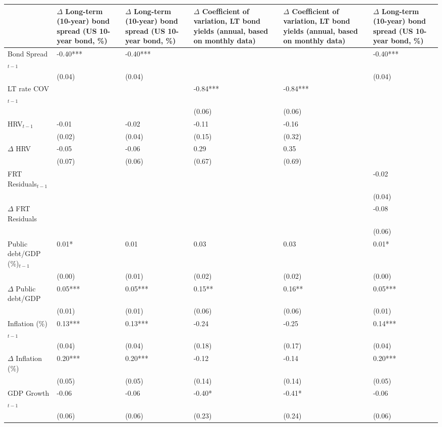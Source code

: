 \begingroup\tiny
\begin{tabular}{lp{3cm}p{3cm}p{3cm}p{3cm}p{3cm}}
  \hline
 & $\Delta$ Long-term (10-year) bond spread (US 10-year bond, \%) & $\Delta$ Long-term (10-year) bond spread (US 10-year bond, \%) & $\Delta$ Coefficient of variation, LT bond yields (annual, based on monthly data) & $\Delta$ Coefficient of variation, LT bond yields (annual, based on monthly data) & $\Delta$ Long-term (10-year) bond spread (US 10-year bond, \%) \\ 
  \hline
Bond Spread$_{t-1}$ & -0.40*** & -0.40*** &  &  & -0.40*** \\ 
   & (0.04) & (0.04) &  &  & (0.04) \\ 
  LT rate COV$_{t-1}$ &  &  & -0.84*** & -0.84*** &  \\ 
   &  &  & (0.06) & (0.06) &  \\ 
  HRV$_{t-1}$ & -0.01 & -0.02 & -0.11 & -0.16 &  \\ 
   & (0.02) & (0.04) & (0.15) & (0.32) &  \\ 
  $\Delta$ HRV & -0.05 & -0.06 & 0.29 & 0.35 &  \\ 
   & (0.07) & (0.06) & (0.67) & (0.69) &  \\ 
  FRT Residuals$_{t-1}$ &  &  &  &  & -0.02 \\ 
   &  &  &  &  & (0.04) \\ 
  $\Delta$ FRT Residuals &  &  &  &  & -0.08 \\ 
   &  &  &  &  & (0.06) \\ 
  Public debt/GDP (\%)$_{t-1}$ & 0.01* & 0.01 & 0.03 & 0.03 & 0.01* \\ 
   & (0.00) & (0.01) & (0.02) & (0.02) & (0.00) \\ 
  $\Delta$ Public debt/GDP & 0.05*** & 0.05*** & 0.15** & 0.16** & 0.05*** \\ 
   & (0.01) & (0.01) & (0.06) & (0.06) & (0.01) \\ 
  Inflation (\%) $_{t-1}$ & 0.13*** & 0.13*** & -0.24 & -0.25 & 0.14*** \\ 
   & (0.04) & (0.04) & (0.18) & (0.17) & (0.04) \\ 
  $\Delta$ Inflation (\%) & 0.20*** & 0.20*** & -0.12 & -0.14 & 0.20*** \\ 
   & (0.05) & (0.05) & (0.14) & (0.14) & (0.05) \\ 
  GDP Growth$_{t-1}$ & -0.06 & -0.06 & -0.40* & -0.41* & -0.06 \\ 
   & (0.06) & (0.06) & (0.23) & (0.24) & (0.06) \\ 

\end{tabular}

